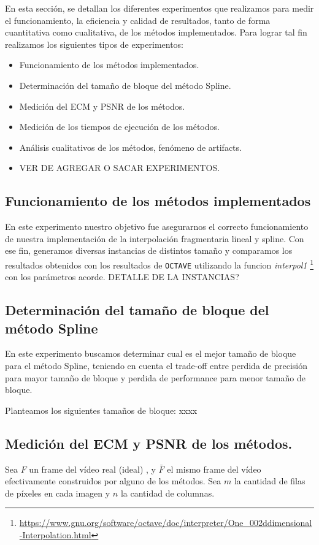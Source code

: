 En esta sección, se detallan los diferentes experimentos que realizamos para medir el funcionamiento, la eficiencia y calidad de resultados, tanto de forma cuantitativa como cualitativa, de los métodos implementados.
Para lograr tal fin realizamos los siguientes tipos de experimentos:
\begin{itemize}
  \item Funcionamiento de los métodos implementados.
  \item Determinación del tamaño de bloque del método Spline.
  \item Medición del ECM y PSNR de los métodos.
  \item Medición de los tiempos de ejecución de los métodos.
  \item Análisis cualitativos de los métodos, fenómeno de artifacts.
  \item VER DE AGREGAR O SACAR EXPERIMENTOS.
\end{itemize}

\subsection{Funcionamiento de los métodos implementados}
En este experimento nuestro objetivo fue asegurarnos el correcto funcionamiento de nuestra implementación de la interpolación fragmentaria lineal y spline. Con ese fin, generamos diversas instancias de distintos tamaño y comparamos los resultados obtenidos con los resultados de \texttt{OCTAVE} utilizando la funcion \textit{interpol1} \footnote{\url{https://www.gnu.org/software/octave/doc/interpreter/One_002ddimensional-Interpolation.html}} con los parámetros acorde.
DETALLE DE LA INSTANCIAS?

\subsection{Determinación del tamaño de bloque del método Spline}
En este experimento buscamos determinar cual es el mejor tamaño de bloque para el método Spline, teniendo en cuenta el trade-off entre perdida de precisión para mayor tamaño de bloque y perdida de performance para menor tamaño de bloque.

Planteamos los siguientes tamaños de bloque: xxxx

\subsection{Medición del ECM y PSNR de los métodos.}
Sea $F$ un frame del vídeo real (ideal) , y $\bar{F}$ el mismo frame del vídeo efectivamente construidos por alguno de los métodos. Sea $m$ la cantidad de filas de píxeles en cada imagen y $n$ la cantidad de columnas.

